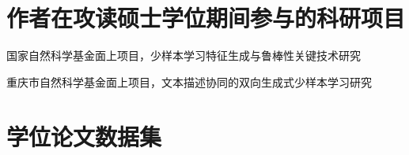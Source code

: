 \section[\hspace{-2pt}作者在攻读硕士学位期间参与的科研项目]{{\heiti{} \hspace{-8pt}作者在攻读硕士学位期间参与的科研项目}}

{
\small
\setlength{\baselineskip}{20pt}
\begin{enumerate}[label={[\arabic*]}, leftmargin=*]
\item 国家自然科学基金面上项目，少样本学习特征生成与鲁棒性关键技术研究
\item 重庆市自然科学基金面上项目，文本描述协同的双向生成式少样本学习研究
\end{enumerate}
}

\newpage
\section[\hspace{-2pt}学位论文数据集]{{\heiti{} \hspace{-8pt}学位论文数据集}}

